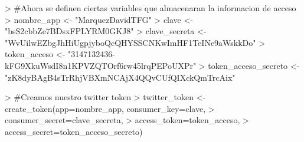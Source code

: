 
\begin{Schunk}
\begin{Sinput}
>   #Ahora se definen ciertas variables que almacenaran la informacion de acceso
>   nombre_app <- "MarquezDavidTFG"
>   clave <- "bsS2cbbZe7BDsxFPLYRM0GKJ8"
>   clave_secreta <- "WvUilwEZbgJhHiUgpjyboQcQHYSSCNKwImHF1TeINe9aWskkDo"
>   token_acceso <- "3147132436-kFG9XkuWsdI8n1KPVZQTOrf6rw45lrqPEPoUXPr"
>   token_acceso_secreto <- "zK8dyBAgB4sTrRhjVBXmNCAjX4QQvCUfQIXckQmTrcAix"

>   #Creamos nuestro twitter token
>   twitter_token <- create_token(app=nombre_app, consumer_key=clave, 
>                                 consumer_secret=clave_secreta, 
>                                 access_token=token_acceso, 
>                                 access_secret=token_acceso_secreto)
\end{Sinput}
\end{Schunk}




